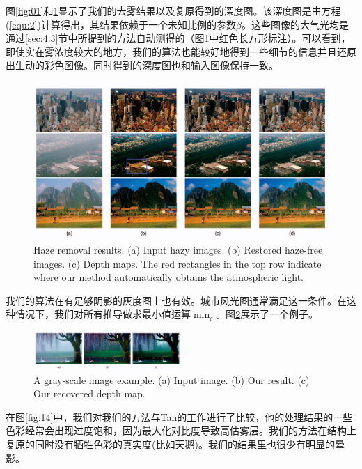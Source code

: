 \documentclass{ctexart}
\begin{document}
图\ref{fig:01}和\ref{fig:12}显示了我们的去雾结果以及复原得到的深度图。该深度图是由方程(\ref{equ:2})计算得出，其结果依赖于一个未知比例的参数$\beta$。这些图像的大气光均是通过\ref{sec:4.3}节中所提到的方法自动测得的（图\ref{fig:12}中红色长方形标注）。可以看到，即使实在雾浓度较大的地方，我们的算法也能较好地得到一些细节的信息并且还原出生动的彩色图像。同时得到的深度图也和输入图像保持一致。\par

\begin{figure}[tbp]
	\centering
	\includegraphics[width=\textwidth]{img/12.jpg}
	\caption{Haze removal results. (a) Input hazy images. (b) Restored haze-free images. (c) Depth maps. The red rectangles in the top row indicate where our method automatically obtains the atmospheric light.}\label{fig:12}
\end{figure}

我们的算法在有足够阴影的灰度图上也有效。城市风光图通常满足这一条件。在这种情况下，我们对所有推导做求最小值运算$\min_c$。图\ref{fig:13}展示了一个例子。\par

\begin{figure}[tbp]
	\centering
	\includegraphics[width=0.5\textwidth]{img/13.jpg}
	\caption{A gray-scale image example. (a) Input image. (b) Our result. (c) Our recovered depth map.}\label{fig:13}
\end{figure}

在图\ref{fig:14}中，我们对我们的方法与Tan的工作\cite{Tan2008}进行了比较，他的处理结果的一些色彩经常会出现过度饱和，因为最大化对比度导致高估雾层。我们的方法在结构上复原的同时没有牺牲色彩的真实度(比如天鹅)。我们的结果里也很少有明显的晕影。\par
\end{document}
